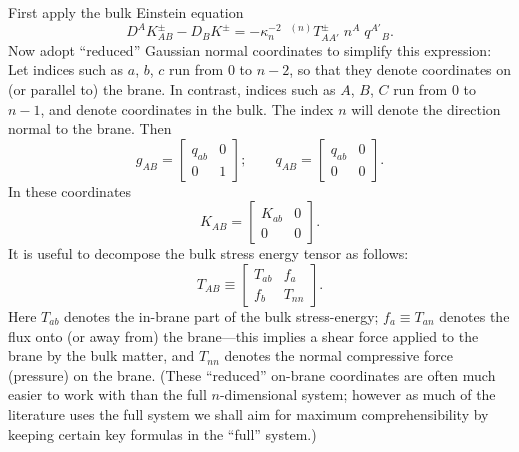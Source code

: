 \documentclass[a4paper,10pt]{article}
\begin{document}
{First apply the bulk Einstein equation
%
\begin{equation}
D^A K_{AB}^\pm - D_B K^\pm = 
-\kappa_n^{-2} \; \; {}^{(n)}T_{AA'}^\pm \; n^A \; q^{A'}{}_B.
\end{equation}
%
Now adopt ``reduced'' Gaussian normal coordinates to simplify this
expression: Let indices such as $a$, $b$, $c$ run from $0$ to $n-2$,
so that they denote coordinates on (or parallel to) the brane. In
contrast, indices such as $A$, $B$, $C$ run from $0$ to $n-1$, and
denote coordinates in the bulk. The index $n$ will denote the
direction normal to the brane. Then
%
\begin{equation}
g_{AB} =
\left[
\begin{array}{cc}q_{ab} & 0\\ 0 & 1 \end{array}
\right];
\qquad
q_{AB} =
\left[
\begin{array}{cc}q_{ab} & 0\\ 0 & 0 \end{array}
\right].
\end{equation}
%
In these coordinates
%
\begin{equation}
K_{AB} =
\left[
\begin{array}{cc}K_{ab} & 0\\ 0 & 0 \end{array}
\right].
\end{equation}
%
It is useful to decompose the bulk stress energy tensor as
follows:
%
\begin{equation}
T_{AB} \equiv 
\left[
\begin{array}{cc}T_{ab} & f_a\\ f_b & T_{nn} \end{array}
\right].
\end{equation}
%
Here $T_{ab}$ denotes the in-brane part of the bulk stress-energy;
$f_a \equiv T_{an}$ denotes the flux onto (or away from) the
brane---this implies a shear force applied to the brane by the bulk
matter, and $T_{nn}$ denotes the normal compressive force (pressure)
on the brane. (These ``reduced'' on-brane coordinates are often much
easier to work with than the full $n$-dimensional system; however as
much of the literature uses the full system we shall aim for maximum
comprehensibility by keeping certain key formulas in the ``full''
system.)


}
\end{document}

